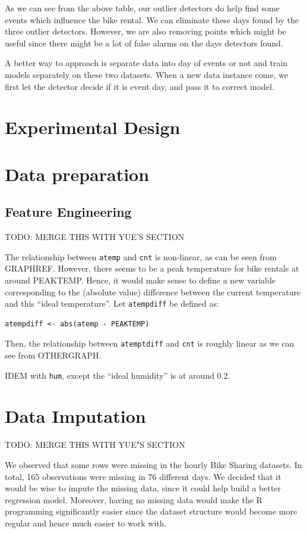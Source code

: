 \documentclass[12pt]{article}
\begin{document}
 	As we can see from the above table, our outlier detectors do help find some events which influence the bike rental. We can eliminate these days found by the three outlier detectors. However, we are also removing points which might be useful since there might be a lot of false alarms on the days detectors found.  
 	
 	A better way to approach is separate data into day of events or not and train models separately on these two datasets. When a new data instance come, we first let the detector decide if it is event day, and pass it to correct model.
	
\section{Experimental Design}
\label{sec:experimental-design}



\section{Data preparation}

\subsection{Feature Engineering}
\label{sec:feature-engineering}
TODO: MERGE THIS WITH YUE'S SECTION

The relationship between \texttt{atemp} and \texttt{cnt} is non-linear, as can be seen from GRAPHREF. However, there seems to be a peak temperature for bike rentals at around PEAKTEMP. Hence, it would make sense to define a new variable corresponding to the (absolute value) difference between the current temperature and this ``ideal temperature''. Let \texttt{atempdiff} be defined as:
\begin{verbatim}
atempdiff <- abs(atemp - PEAKTEMP)
\end{verbatim}
Then, the relationship between \texttt{atemptdiff} and \texttt{cnt} is roughly linear as we can see from OTHERGRAPH.

IDEM with \texttt{hum}, except the ``ideal humidity'' is at around 0.2.

\section{Data Imputation}
\label{sec:imputation}
TODO: MERGE THIS WITH YUE"S SECTION

We observed that some rows were missing in the hourly Bike Sharing datasets. In total, 165 observations were missing in 76 different days. We decided that it would be wise to impute the missing data, since it could help build a better regression model. Moreover, having no missing data would make the R programming significantly easier since the dataset structure would become more regular and hence much easier to work with.
\end{document}
